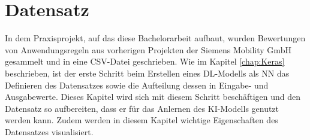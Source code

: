 \chapter{Datensatz}
\label{chap:Datensatz}
In dem Praxisprojekt, auf das diese Bachelorarbeit aufbaut, wurden Bewertungen von Anwendungsregeln aus vorherigen Projekten der Siemens Mobility GmbH gesammelt und in eine CSV-Datei geschrieben.
Wie im Kapitel \ref{chap:Keras} beschrieben, ist der erste Schritt beim Erstellen eines \ac{DL}-Modells als \ac{NN} das Definieren des Datensatzes sowie die Aufteilung
dessen in Eingabe- und Ausgabewerte. Dieses Kapitel wird sich mit diesem Schritt beschäftigen und den Datensatz so aufbereiten, dass er für das Anlernen des \ac{KI}-Modells genutzt werden
kann. Zudem werden in diesem Kapitel wichtige Eigenschaften des Datensatzes visualisiert.







